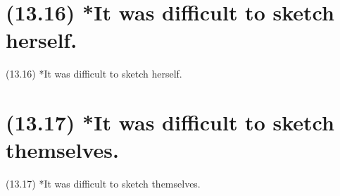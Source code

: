 \documentclass{article}
\begin{document}
\clearpage

%
%

\section*{(13.16) *It was difficult to sketch herself.}

\bigbreak
\begin{enumerate*}
\item[(13.16)] *It was difficult to sketch herself.
\end{enumerate*}
\bigbreak

\bigbreak
\begin{minipage}{\textwidth}
\end{minipage}
\bigbreak

\clearpage

%
%

\section*{(13.17) *It was difficult to sketch themselves.}

\bigbreak
\begin{enumerate*}
\item[(13.17)] *It was difficult to sketch themselves.
\end{enumerate*}
\bigbreak
\end{document}
